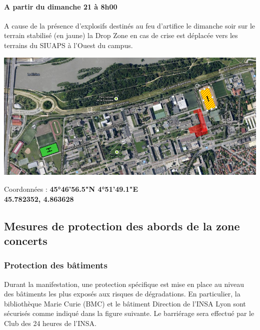 \documentclass[hidelinks, paper=a4, fontsize=13pt]{report}
\begin{document}
\paragraph{A partir du dimanche 21 à 8h00}
A cause de la présence d’explosifs destinés au feu d’artifice le dimanche soir sur le terrain stabilisé (en jaune) la Drop Zone en cas de crise est déplacée vers les terrains du SIUAPS à l’Ouest du campus.


\begin{center}
	\includegraphics[scale=0.4]{Annexes/Plans/dropZoneDimanche}
\end{center}


\begin{center}
	Coordonnées : \textbf{45°46'56.5"N 4°51'49.1"E}\\
	\textbf{45.782352, 4.863628}
\end{center}
\newpage

\subsection{Mesures de protection des abords de la zone concerts}
\subsubsection{Protection des bâtiments} 
Durant la manifestation, une protection spécifique est mise en place au niveau des bâtiments les plus exposés aux risques de dégradations. En particulier, la bibliothèque Marie Curie (BMC) et le bâtiment Direction de l'INSA Lyon sont sécurisés comme indiqué dans la figure suivante. Le barriérage sera effectué par le Club des 24 heures de l'INSA.
\end{document}
